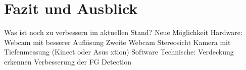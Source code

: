 
\chapter{Fazit und Ausblick}
\label{chap:prospect}

Was ist noch zu verbessern im aktuellen Stand?
Neue Möglichkeit Hardware:
Webcam mit besserer Auflösung
Zweite Webcam Stereosicht
Kamera mit Tiefenmessung (Kinect oder Asus xtion) 
Software Technische:
Verdeckung erkennen
Verbesserung der FG Detection

